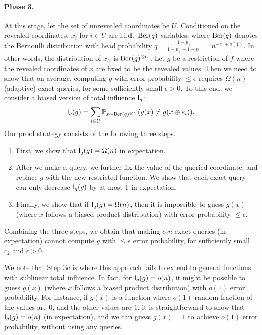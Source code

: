 \paragraph{Phase 3.} At this stage, let the set of unrevealed coordinates be $U$. Conditioned on the revealed coordinates, $x_i$ for $i\in U$ are i.i.d.~$\operatorname{\mathrm{Ber}}(q)$ variables, where  $\operatorname{\mathrm{Ber}}(q)$ denotes the Bernoulli distribution with head probability $q=\frac{1-p_+}{1-p_++1-p_-}=n^{-c_3\pm o(1)}$. In other words, the distribution of $x_U$ is $\operatorname{\mathrm{Ber}}(q)^{\otimes U}$. Let $g$ be a restriction of $f$ where the revealed coordinates of $x$ are fixed to be the revealed values. Then we need to show that on average, computing $g$ with error probability $\le \epsilon$ requires $\Omega(n)$ (adaptive) exact queries, for some sufficiently small $\epsilon > 0$. To this end, we consider a biased version of total influence $\operatorname{\mathsf{I}}_q$:
\begin{align*}
  \operatorname{\mathsf{I}}_q(g) = \sum_{i\in U} \mathbb{P}_{x\sim \operatorname{\mathrm{Ber}}(q)^{\otimes U}}( g(x) \ne g(x\oplus e_i)).
\end{align*}
Our proof strategy consists of the following three steps.
\begin{enumerate}[label=3\alph*.]
  \item First, we show that $\operatorname{\mathsf{I}}_q(g) = \Omega(n)$ in expectation.
  \item After we make a query, we further fix the value of the queried coordinate, and replace $g$ with the new restricted function. We show that each exact query can only decrease $\operatorname{\mathsf{I}}_q(g)$ by at most $1$ in expectation.
  \item Finally, we show that if $\operatorname{\mathsf{I}}_q(g) = \Omega(n)$, then it is impossible to guess $g(x)$ (where $x$ follows a biased product distribution) with error probability $\le \epsilon$.
\end{enumerate}
Combining the three steps, we obtain that making $c_2n$ exact queries (in expectation) cannot compute $g$ with $\le \epsilon$ error probability, for sufficiently small $c_2$ and $\epsilon > 0$.

We note that Step 3c is where this approach fails to extend to general functions with sublinear total influence. In fact, for $\operatorname{\mathsf{I}}_q(g) = o(n)$, it might be possible to guess $g(x)$ (where $x$ follows a biased product distribution) with $o(1)$ error probability. For instance, if $g(x)$ is a function where $o(1)$ random fraction of the values are $0$, and the other values are $1$, it is straightforward to show that $\operatorname{\mathsf{I}}_q(g) = o(n)$ (in expectation), and we can guess $g(x)=1$ to achieve $o(1)$ error probability, without using any queries.

